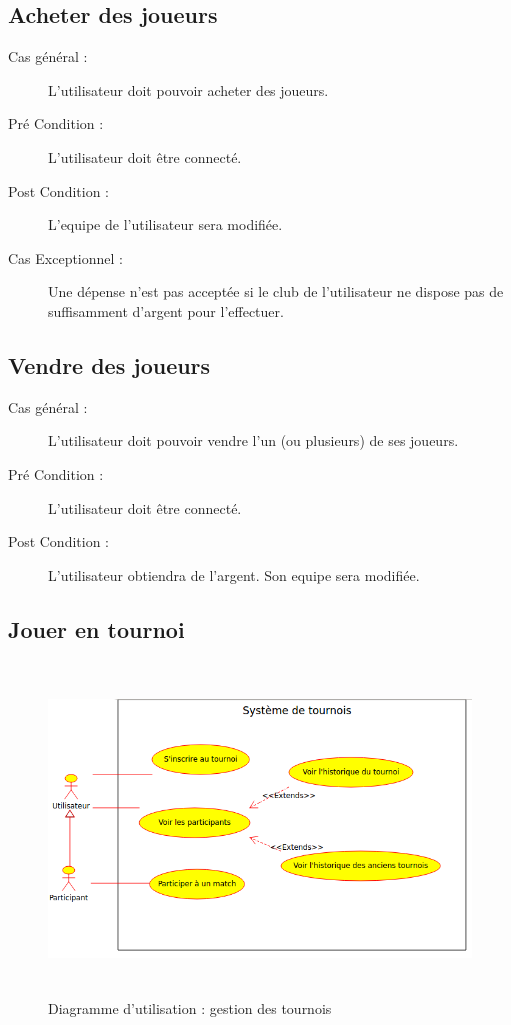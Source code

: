 \documentclass[a4paper]{report}
\begin{document}
\subsection{Acheter des \glspl{joueur}}
\begin{description}
    \item[Cas général :] L'\gls{utilisateur} doit pouvoir acheter des \glspl{joueur}.
    \item[Pré Condition  :] L'\gls{utilisateur} doit être connecté.
    \item[Post Condition :] L'\gls{equipe} de l'\gls{utilisateur} sera modifiée.
    \item[Cas Exceptionnel :] Une dépense n'est pas acceptée si le \gls{club} de l'\gls{utilisateur} ne dispose pas de suffisamment d'argent pour l'effectuer.
\end{description}

\subsection{Vendre des \glspl{joueur}}
\begin{description}
    \item[Cas général :] L'\gls{utilisateur} doit pouvoir vendre l'un (ou plusieurs) de ses \glspl{joueur}.
    \item[Pré Condition  :] L'\gls{utilisateur} doit être connecté.
    \item[Post Condition :] L'\gls{utilisateur} obtiendra de l'argent. Son \gls{equipe} sera modifiée.
\end{description}

\subsection{Jouer en tournoi}
\begin{figure}[H]
    \begin{center}
        \caption{\label{diag-use-championship} Diagramme d'utilisation : gestion des tournois}
        \includegraphics[height=250pt]{uml/usrTournoi.png}
    \end{center}
\end{figure}
\end{document}
